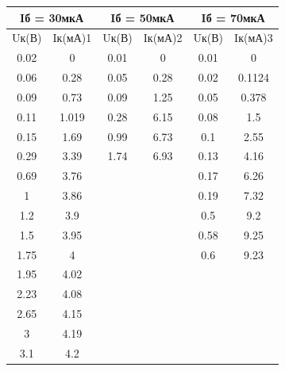 \documentclass[a4paper,14pt]{article}
\begin{document}
\begin{table}[]
	\begin{tabular}{|c|c|c|c|c|c|}
		\hline
		\multicolumn{2}{|c|}{Iб = 30мкА} & \multicolumn{2}{c|}{Iб = 50мкА} & \multicolumn{2}{c|}{Iб = 70мкА} \\ \hline
		Uк(В)          & Iк(мА)1         & Uк(В)         & Iк(мА)2         & Uк(В)         & Iк(мА)3         \\ \hline
		0.02           & 0               & 0.01          & 0               & 0.01          & 0               \\ \hline
		0.06           & 0.28            & 0.05          & 0.28            & 0.02          & 0.1124          \\ \hline
		0.09           & 0.73            & 0.09          & 1.25            & 0.05          & 0.378           \\ \hline
		0.11           & 1.019           & 0.28          & 6.15            & 0.08          & 1.5             \\ \hline
		0.15           & 1.69            & 0.99          & 6.73            & 0.1           & 2.55            \\ \hline
		0.29           & 3.39            & 1.74          & 6.93            & 0.13          & 4.16            \\ \hline
		0.69           & 3.76            &               &                 & 0.17          & 6.26            \\ \hline
		1              & 3.86            &               &                 & 0.19          & 7.32            \\ \hline
		1.2            & 3.9             &               &                 & 0.5           & 9.2             \\ \hline
		1.5            & 3.95            &               &                 & 0.58          & 9.25            \\ \hline
		1.75           & 4               &               &                 & 0.6           & 9.23            \\ \hline
		1.95           & 4.02            &               &                 &               &                 \\ \hline
		2.23           & 4.08            &               &                 &               &                 \\ \hline
		2.65           & 4.15            &               &                 &               &                 \\ \hline
		3              & 4.19            &               &                 &               &                 \\ \hline
		3.1            & 4.2             &               &                 &               &                 \\ \hline
	\end{tabular}
\end{table}
\end{document}
